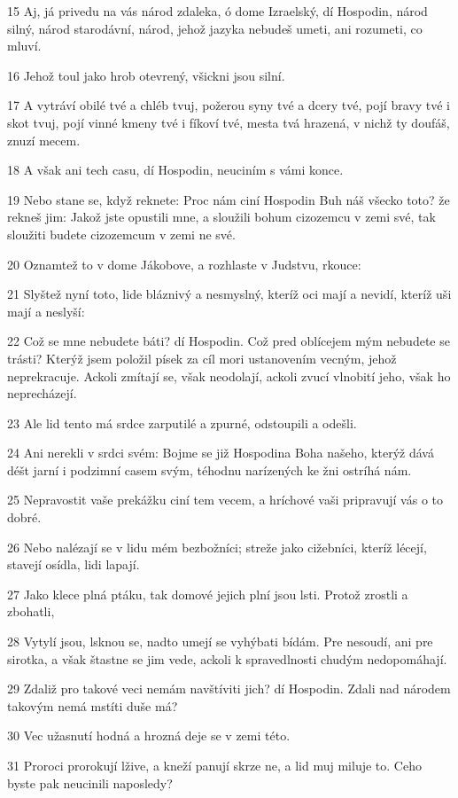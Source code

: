 \par 15 Aj, já privedu na vás národ zdaleka, ó dome Izraelský, dí Hospodin, národ silný, národ starodávní, národ, jehož jazyka nebudeš umeti, ani rozumeti, co mluví.
\par 16 Jehož toul jako hrob otevrený, všickni jsou silní.
\par 17 A vytráví obilé tvé a chléb tvuj, požerou syny tvé a dcery tvé, pojí bravy tvé i skot tvuj, pojí vinné kmeny tvé i fíkoví tvé, mesta tvá hrazená, v nichž ty doufáš, znuzí mecem.
\par 18 A však ani tech casu, dí Hospodin, neuciním s vámi konce.
\par 19 Nebo stane se, když reknete: Proc nám ciní Hospodin Buh náš všecko toto? že rekneš jim: Jakož jste opustili mne, a sloužili bohum cizozemcu v zemi své, tak sloužiti budete cizozemcum v zemi ne své.
\par 20 Oznamtež to v dome Jákobove, a rozhlaste v Judstvu, rkouce:
\par 21 Slyštež nyní toto, lide bláznivý a nesmyslný, kteríž oci mají a nevidí, kteríž uši mají a neslyší:
\par 22 Což se mne nebudete báti? dí Hospodin. Což pred oblícejem mým nebudete se trásti? Kterýž jsem položil písek za cíl mori ustanovením vecným, jehož neprekracuje. Ackoli zmítají se, však neodolají, ackoli zvucí vlnobití jeho, však ho neprecházejí.
\par 23 Ale lid tento má srdce zarputilé a zpurné, odstoupili a odešli.
\par 24 Ani nerekli v srdci svém: Bojme se již Hospodina Boha našeho, kterýž dává déšt jarní i podzimní casem svým, téhodnu narízených ke žni ostríhá nám.
\par 25 Nepravostit vaše prekážku ciní tem vecem, a hríchové vaši pripravují vás o to dobré.
\par 26 Nebo nalézají se v lidu mém bezbožníci; streže jako cižebníci, kteríž lécejí, stavejí osídla, lidi lapají.
\par 27 Jako klece plná ptáku, tak domové jejich plní jsou lsti. Protož zrostli a zbohatli,
\par 28 Vytylí jsou, lsknou se, nadto umejí se vyhýbati bídám. Pre nesoudí, ani pre sirotka, a však štastne se jim vede, ackoli k spravedlnosti chudým nedopomáhají.
\par 29 Zdaliž pro takové veci nemám navštíviti jich? dí Hospodin. Zdali nad národem takovým nemá mstíti duše má?
\par 30 Vec užasnutí hodná a hrozná deje se v zemi této.
\par 31 Proroci prorokují lžive, a kneží panují skrze ne, a lid muj miluje to. Ceho byste pak neucinili naposledy?

